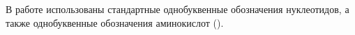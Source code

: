 





















\vskip 24pt

В работе использованы стандартные однобуквенные обозначения нуклеотидов, а также однобуквенные обозначения аминокислот (\cite{IUPAC1984}).

